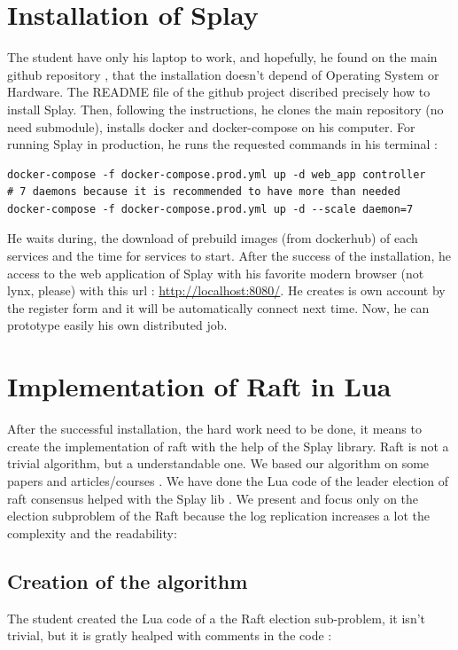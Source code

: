 \documentclass{eplmastersthesis}
\begin{document}
      \section{Installation of Splay} %

        The student have only his laptop to work, and hopefully, he found on the main github repository \cite{SplayV2Git},
        that the installation doesn't depend of Operating System or Hardware. The README file of the github project discribed
        precisely how to install Splay. Then, following the instructions, he clones the main repository (no need submodule),
        installs docker and docker-compose on his computer. For running Splay in production,
        he runs the requested commands in his terminal :
        \begin{lstlisting}[style=MyBash]
docker-compose -f docker-compose.prod.yml up -d web_app controller
# 7 daemons because it is recommended to have more than needed
docker-compose -f docker-compose.prod.yml up -d --scale daemon=7
        \end{lstlisting}
        He waits during, the download of prebuild images (from dockerhub) of each services and the time for services to start.
        After the success of the installation, he access to the web application of Splay with his favorite modern browser
        (not lynx, please) with this url : \url{http://localhost:8080/}.
        He creates is own account by the register form and it will be automatically connect next time. Now, he can prototype
        easily his own distributed job.

      \section{Implementation of Raft in Lua} %
        After the successful installation, the hard work need to be done, it means to create the implementation of raft
        with the help of the Splay library. Raft is not a trivial algorithm, but a understandable one.
        We based our algorithm on some papers \cite{RaftPaper} and articles/courses \cite{RaftSlide} \cite{RaftSite}.
        We have done the Lua code of the leader election of raft consensus helped with the Splay lib \cite{SplayLib}.
        We present and focus only on the election subproblem of the Raft because the log replication
        increases a lot the complexity and the readability: \\

        \subsection{Creation of the algorithm} %
        The student created the Lua code of a the Raft election sub-problem, it isn't trivial,
        but it is gratly healped with comments in the code :
\end{document}
